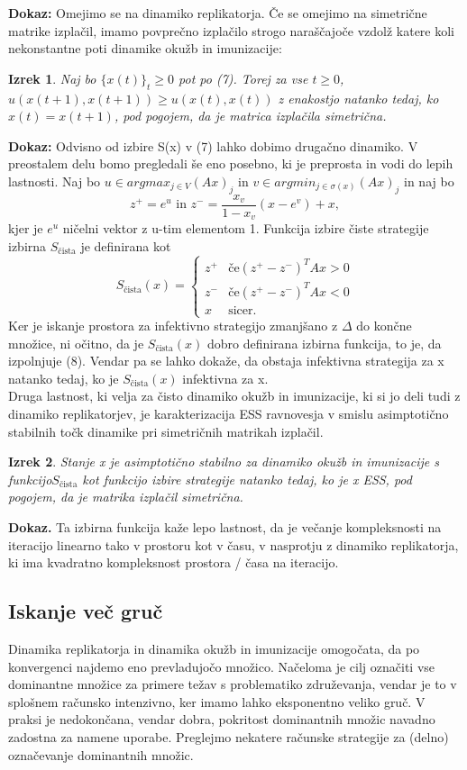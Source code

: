 \documentclass[a4paper]{article}
\newtheorem{theorem}{Izrek}
\begin{document}
\textbf{Dokaz:} Omejimo se na dinamiko replikatorja. Če se omejimo na simetrične matrike izplačil, imamo povprečno izplačilo strogo naraščajoče vzdolž katere koli nekonstantne poti dinamike okužb in imunizacije: 
\begin{theorem}
Naj bo $\{x(t)\}_t \geq 0$ pot po (7). Torej za vse $t \geq 0$, $u (x (t + 1), x (t + 1)) \geq u (x (t), x (t))$ z enakostjo natanko tedaj, ko $x (t) = x (t + 1)$, pod pogojem, da je matrica izplačila simetrična.
\end{theorem}
\textbf{Dokaz:} Odvisno od izbire S(x) v (7) lahko dobimo drugačno dinamiko. V preostalem delu bomo pregledali še eno posebno, ki je preprosta in vodi do lepih lastnosti. Naj bo $u \in arg max_{j \in V} (A x)_j$ in $v \in arg min_{j \in\sigma (x)} (A x)_j$ in naj bo
$$z^+ = e^u \text{ in } z^- = \frac{x_v}{1 - x_v} (x - e^v) + x, $$ kjer je $e^u$ ničelni vektor z u-tim elementom 1. Funkcija izbire čiste strategije izbirna $S_{\text{čista}}$ je definirana kot
$$ S_{\text{čista}}(x) = \begin{cases}
z^+ & \text{če} (z^+ - z^-)^T A x> 0\\
z^- & \text{če} (z^+ - z^-)^T A x <0\\
x & \text{sicer.}
\end{cases}$$
Ker je iskanje prostora za infektivno strategijo zmanjšano z $\Delta$ do končne množice, ni očitno, da je $S_{\text{čista}} (x)$ dobro definirana izbirna funkcija, to je, da izpolnjuje (8). Vendar pa se lahko dokaže, da obstaja infektivna strategija za x natanko tedaj, ko je $S_{\text{čista}} (x)$ infektivna za x.\\
Druga lastnost, ki velja za čisto dinamiko okužb in imunizacije, ki si jo deli tudi z dinamiko replikatorjev, je karakterizacija ESS ravnovesja v smislu asimptotično stabilnih točk dinamike pri simetričnih matrikah izplačil.
\begin{theorem} 
Stanje x je asimptotično stabilno za dinamiko okužb in imunizacije s funkcijo$S_{\text{čista}}$ kot funkcijo izbire strategije natanko tedaj, ko je x ESS, pod pogojem, da je matrika izplačil simetrična.
\end{theorem}
\textbf{Dokaz.} Ta izbirna funkcija kaže lepo lastnost, da je večanje kompleksnosti na iteracijo linearno tako v prostoru kot v času, v nasprotju z dinamiko replikatorja, ki ima kvadratno kompleksnost prostora / časa na iteracijo. 

\subsection{Iskanje več gruč}
Dinamika replikatorja in dinamika okužb in imunizacije omogočata, da po konvergenci najdemo eno prevladujočo množico. Načeloma je cilj označiti vse dominantne množice za primere težav s problematiko združevanja, vendar je to v splošnem računsko intenzivno, ker imamo lahko eksponentno veliko gruč. V praksi je nedokončana, vendar dobra, pokritost dominantnih množic navadno zadostna za namene uporabe. Preglejmo nekatere računske strategije za (delno) označevanje dominantnih množic.
\end{document}
